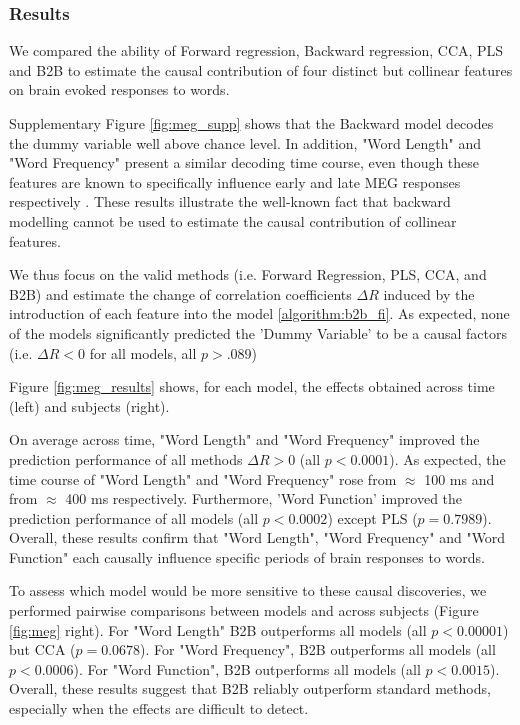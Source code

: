 \subsubsection{Results}
We compared the ability of Forward regression, Backward regression, CCA, PLS and B2B to estimate the causal contribution of four distinct but collinear features on brain evoked responses to words.

Supplementary Figure \ref{fig:meg_supp} shows that the Backward model decodes the dummy variable well above chance level. In addition, "Word Length" and "Word Frequency" present a similar decoding time course, even though these features are known to specifically influence early and late MEG responses respectively \citep{kutas2011thirty}. These results illustrate the well-known fact that backward modelling cannot be used to estimate the causal contribution of collinear features.

We thus focus on the valid methods (i.e. Forward Regression, PLS, CCA, and B2B) and estimate the change of correlation coefficients $\Delta R$ induced by the introduction of each feature into the model \ref{algorithm:b2b_fi}. As expected, none of the models significantly predicted the 'Dummy Variable' to be a causal factors (i.e. $\Delta R < 0$ for all models, all $p > .089$)

Figure \ref{fig:meg_results} shows, for each model, the effects obtained across time (left) and subjects (right).

On average across time, "Word Length" and "Word Frequency" improved the prediction performance of all methods $\Delta R>0$ (all $p<0.0001$). As expected, the time course of "Word Length" and "Word Frequency" rose from $\approx$ 100 ms and from $\approx$ 400 ms respectively. Furthermore, 'Word Function' improved the prediction performance of all models (all $p < 0.0002$) except PLS ($p=0.7989$). Overall, these results confirm that "Word Length", "Word Frequency" and "Word Function" each causally influence specific periods of brain responses to words.

To assess which model would be more sensitive to these causal discoveries, we performed pairwise comparisons between models and across subjects (Figure \ref{fig:meg} right). For "Word Length" B2B outperforms all models (all $p < 0.00001$) but CCA ($p=0.0678$). For "Word Frequency", B2B outperforms all models (all $p < 0.0006$). For "Word Function", B2B outperforms all models (all $p < 0.0015$). Overall, these results suggest that B2B reliably outperform standard methods, especially when the effects are difficult to detect.
